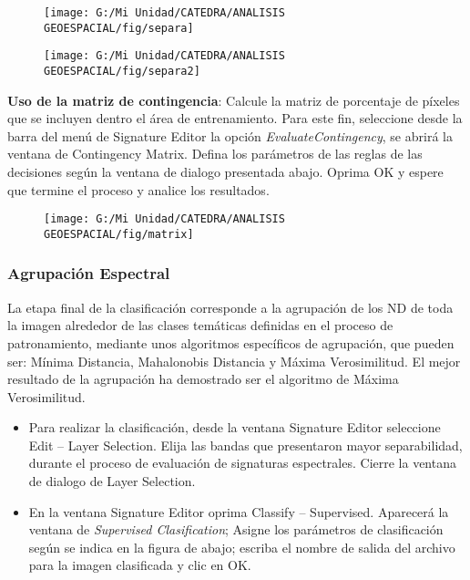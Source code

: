 \documentclass[a4paper,oneside,11pt,]{article}
\begin{document}
\begin{figure}
\centering
\texttt{[image: G:/Mi Unidad/CATEDRA/ANALISIS GEOESPACIAL/fig/separa]}
\end{figure}

\begin{figure}
\centering
\texttt{[image: G:/Mi Unidad/CATEDRA/ANALISIS GEOESPACIAL/fig/separa2]}
\end{figure}

\textbf{Uso de la matriz de contingencia}: Calcule la matriz de porcentaje de píxeles que se incluyen dentro el área de entrenamiento. Para este fin, seleccione desde la barra del menú de Signature Editor la opción \emph{Evaluate}\textrightarrow \emph{Contingency}, se abrirá  la ventana de Contingency Matrix. Defina los parámetros de las reglas de las decisiones según la ventana de dialogo  presentada abajo. Oprima OK  y espere que termine el proceso y  analice los resultados.   

\begin{figure}
\centering
\texttt{[image: G:/Mi Unidad/CATEDRA/ANALISIS GEOESPACIAL/fig/matrix]}
\end{figure}

\subsubsection{Agrupación Espectral}
La etapa final de la clasificación corresponde a la agrupación de los ND de toda la imagen alrededor de las clases temáticas definidas en el proceso de patronamiento, mediante unos algoritmos específicos de agrupación, que pueden ser: Mínima Distancia, Mahalonobis Distancia y Máxima Verosimilitud. El mejor resultado de la agrupación ha demostrado ser el algoritmo de Máxima Verosimilitud.
\begin{itemize}
\item Para realizar la clasificación, desde la ventana Signature Editor seleccione Edit – Layer Selection. Elija las bandas que presentaron mayor separabilidad, durante el proceso de evaluación de signaturas espectrales.  Cierre la ventana de dialogo de Layer Selection.
\item En la ventana Signature Editor oprima Classify – Supervised.   Aparecerá la ventana de \emph{Supervised Clasification};  Asigne los parámetros de clasificación según se indica en la figura de abajo; escriba el nombre de salida del archivo  para la imagen clasificada y clic en OK. 
\end{itemize}
\end{document}
